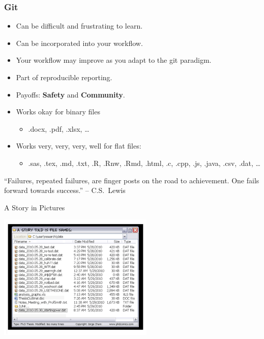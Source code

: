   \begin{frame}[t]
    \frametitle{Git}
    \begin{itemize}
      \item Can be difficult and frustrating to learn.
      \item Can be incorporated into your workflow.
      \item Your workflow may improve as you adapt to the git paradigm.
      \item Part of reproducible reporting.
      \item Payoffs: {\bf Safety} and {\bf Community}.
      \item Works okay for binary files 
        \begin{itemize} \item .docx, .pdf, .xlsx, \ldots \end{itemize}
      \item Works very, very, very, well for flat files: 
        \begin{itemize} \item .sas, .tex, .md, .txt, .R, .Rnw, .Rmd, .html, .c,
          .cpp, .js, .java, .csv, .dat, \ldots \end{itemize}
        
    \end{itemize}
    ``Failures, repeated failures, are finger posts on the road to achievement.
    One fails forward towards success.'' -- C.S.\ Lewis
  \end{frame}

  \begin{frame}[t]{A Story in Pictures} 
    \begin{center}
      \includegraphics[height=2.350in]{./images/phd052810s} 
    \end{center} 
  \end{frame}
    

